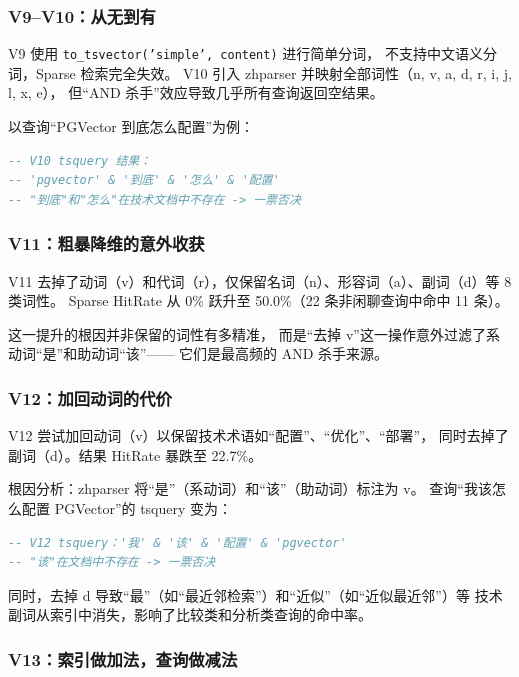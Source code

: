 \documentclass[a4paper, 12pt]{ctexart}
\begin{document}
\subsubsection{V9--V10：从无到有}

V9 使用 \texttt{to\_tsvector('simple', content)} 进行简单分词，
不支持中文语义分词，Sparse 检索完全失效。
V10 引入 zhparser 并映射全部词性（n, v, a, d, r, i, j, l, x, e），
但``AND 杀手''效应导致几乎所有查询返回空结果。

以查询``PGVector 到底怎么配置''为例：
\begin{lstlisting}[language=SQL]
-- V10 tsquery 结果：
-- 'pgvector' & '到底' & '怎么' & '配置'
-- "到底"和"怎么"在技术文档中不存在 -> 一票否决
\end{lstlisting}

\subsubsection{V11：粗暴降维的意外收获}

V11 去掉了动词（v）和代词（r），仅保留名词（n）、形容词（a）、副词（d）等 8 类词性。
Sparse HitRate 从 0\% 跃升至 50.0\%（22 条非闲聊查询中命中 11 条）。

这一提升的根因并非保留的词性有多精准，
而是``去掉 v''这一操作意外过滤了系动词``是''和助动词``该''——
它们是最高频的 AND 杀手来源。

\subsubsection{V12：加回动词的代价}

V12 尝试加回动词（v）以保留技术术语如``配置''、``优化''、``部署''，
同时去掉了副词（d）。结果 HitRate 暴跌至 22.7\%。

根因分析：zhparser 将``是''（系动词）和``该''（助动词）标注为 v。
查询``我该怎么配置 PGVector''的 tsquery 变为：
\begin{lstlisting}[language=SQL]
-- V12 tsquery：'我' & '该' & '配置' & 'pgvector'
-- "该"在文档中不存在 -> 一票否决
\end{lstlisting}

同时，去掉 d 导致``最''（如``最近邻检索''）和``近似''（如``近似最近邻''）等
技术副词从索引中消失，影响了比较类和分析类查询的命中率。

\subsubsection{V13：索引做加法，查询做减法}
\end{document}
